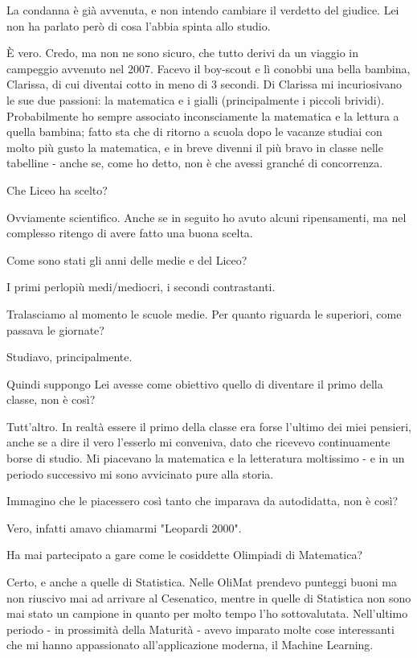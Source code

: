 \documentclass[a4paper,12pt]{article}
\newcommand{\Walter}{\speak{W}}
\newcommand{\Pollazzi}{\speak{P}}
\begin{document}
\begin{dialogue}
\Pollazzi La condanna è già avvenuta, e non intendo cambiare il verdetto del
giudice.  Lei non ha parlato però di cosa l'abbia spinta allo studio.

\Walter È vero. Credo, ma non ne sono sicuro, che tutto derivi da un viaggio in campeggio avvenuto nel 2007. Facevo il boy-scout e lì conobbi una bella bambina, Clarissa, di cui diventai cotto in meno di 3 secondi. Di Clarissa mi incuriosivano le sue due passioni: la matematica e i gialli (principalmente i piccoli brividi). Probabilmente ho sempre associato inconsciamente la matematica e la lettura a quella bambina; fatto sta che di ritorno a scuola dopo le vacanze studiai con molto più gusto la matematica, e in breve divenni il più bravo in classe nelle tabelline - anche se, come ho detto, non è che avessi granché di concorrenza.

\Pollazzi Che Liceo ha scelto?

\Walter Ovviamente scientifico. Anche se in seguito ho avuto alcuni ripensamenti, ma nel complesso ritengo di avere fatto una buona scelta.

\Pollazzi Come sono stati gli anni delle medie e del Liceo?

\Walter I primi perlopiù medi/mediocri, i secondi contrastanti.

\Pollazzi Tralasciamo al momento le scuole medie. Per quanto riguarda le superiori, come passava le giornate?

\Walter Studiavo, principalmente.

\Pollazzi Quindi suppongo Lei avesse come obiettivo quello di diventare il primo della classe, non è così?

\Walter Tutt'altro. In realtà essere il primo della classe era forse l'ultimo dei miei pensieri, anche se a dire il vero l'esserlo mi conveniva, dato che ricevevo continuamente borse di studio. Mi piacevano la matematica e la letteratura moltissimo - e in un periodo successivo mi sono avvicinato pure alla storia.

\Pollazzi Immagino che le piacessero così tanto che imparava da autodidatta, non è così?

\Walter Vero, infatti amavo chiamarmi "Leopardi 2000".

\Pollazzi Ha mai partecipato a gare come le cosiddette Olimpiadi di Matematica?

\Walter Certo, e anche a quelle di Statistica. Nelle OliMat prendevo punteggi buoni ma non riuscivo mai ad arrivare al Cesenatico, mentre in quelle di Statistica non sono mai stato un campione in quanto per molto tempo l'ho sottovalutata. Nell'ultimo periodo - in prossimità della Maturità - avevo imparato molte cose interessanti che mi hanno appassionato all'applicazione moderna, il Machine Learning.


\end{dialogue}
\end{document}
